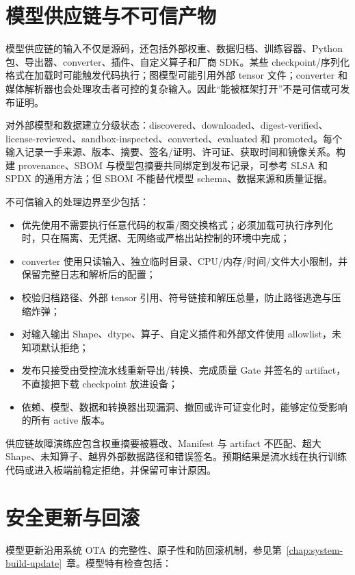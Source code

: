 \section{模型供应链与不可信产物}

模型供应链的输入不仅是源码，还包括外部权重、数据归档、训练容器、Python 包、导出器、converter、插件、自定义算子和厂商 SDK。某些 checkpoint/序列化格式在加载时可能触发代码执行；图模型可能引用外部 tensor 文件；converter 和媒体解析器也会处理攻击者可控的复杂输入。因此“能被框架打开”不是可信或可发布证明。

对外部模型和数据建立分级状态：discovered、downloaded、digest-verified、license-reviewed、sandbox-inspected、converted、evaluated 和 promoted。每个输入记录一手来源、版本、摘要、签名/证明、许可证、获取时间和镜像关系。构建 provenance、SBOM 与模型包摘要共同绑定到发布记录，可参考 SLSA 和 SPDX 的通用方法\cite{slsa-spec,spdx-spec}；但 SBOM 不能替代模型 schema、数据来源和质量证据。

不可信输入的处理边界至少包括：

\begin{itemize}
  \item 优先使用不需要执行任意代码的权重/图交换格式；必须加载可执行序列化时，只在隔离、无凭据、无网络或严格出站控制的环境中完成；
  \item converter 使用只读输入、独立临时目录、CPU/内存/时间/文件大小限制，并保留完整日志和解析后的配置；
  \item 校验归档路径、外部 tensor 引用、符号链接和解压总量，防止路径逃逸与压缩炸弹；
  \item 对输入输出 Shape、dtype、算子、自定义插件和外部文件使用 allowlist，未知项默认拒绝；
  \item 发布只接受由受控流水线重新导出/转换、完成质量 Gate 并签名的 artifact，不直接把下载 checkpoint 放进设备；
  \item 依赖、模型、数据和转换器出现漏洞、撤回或许可证变化时，能够定位受影响的所有 active 版本。
\end{itemize}

供应链故障演练应包含权重摘要被篡改、Manifest 与 artifact 不匹配、超大 Shape、未知算子、越界外部数据路径和错误签名。预期结果是流水线在执行训练代码或进入板端前稳定拒绝，并保留可审计原因。

\section{安全更新与回滚}

模型更新沿用系统 OTA 的完整性、原子性和防回滚机制，参见第~\ref{chap:system-build-update}~章。模型特有检查包括：

